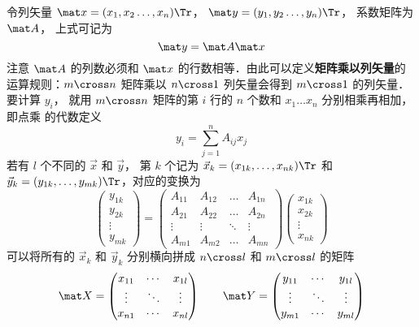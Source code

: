 令列矢量 $\mat x = (x_1,x_2 \dots, x_n)\Tr $，  $\mat y = (y_1,y_2 \dots, y_n)\Tr$， 系数矩阵为 $\mat A$， 上式可记为
\begin{equation}
\mat y = \mat A\mat x
\end{equation} 
注意 $\mat A$ 的列数必须和 $\mat x$ 的行数相等．由此可以定义\textbf{矩阵乘以列矢量}的运算规则：$m \cross n$ 矩阵乘以 $n \cross 1$ 列矢量会得到 $m \cross 1$ 的列矢量．要计算 $y_i$， 就用 $m \cross n$ 矩阵的第 $i$ 行的 $n$ 个数和 ${x_1}\dots{x_n}$ 分别相乘再相加，即点乘 的代数定义
\begin{equation}
y_i = \sum_{j = 1}^n A_{ij} x_j 
\end{equation}
若有 $l$ 个不同的 $\vec x$ 和 $\vec y$， 第 $k$ 个记为 $\vec x_k = (x_{1k},\dots, x_{nk})\Tr$ 和 $\vec y_k = (y_{1k},\dots, y_{mk})\Tr$，对应的变换为
\begin{equation}
\begin{pmatrix} y_{1k} \\ y_{2k}\\ \vdots \\ y_{mk} \end{pmatrix}
= \begin{pmatrix}
A_{11}  & A_{12} & \ldots & A_{1n} \\
A_{21}  & A_{22} & \ldots & A_{2n} \\
 \vdots & \vdots  & \ddots & \vdots \\
A_{m1}  & A_{m2} & \ldots & A_{mn}
\end{pmatrix}
\begin{pmatrix} x_{1k} \\ x_{2k} \\ \vdots \\ x_{nk} \end{pmatrix}
\end{equation}
可以将所有的 $\vec x_k$ 和 $\vec y_k$ 分别横向拼成 $n \cross l$ 和 $m \cross l$ 的矩阵
\begin{equation}
\mat X =
\begin{pmatrix}
x_{11} & \cdots & x_{1l} \\
 \vdots & \ddots & \vdots \\
x_{n1} & \cdots & x_{nl}
\end{pmatrix}
\qquad
\mat Y =
\begin{pmatrix}
y_{11} & \cdots & y_{1l} \\
 \vdots & \ddots & \vdots \\
y_{m1} & \cdots & y_{ml}
\end{pmatrix}
\end{equation}
